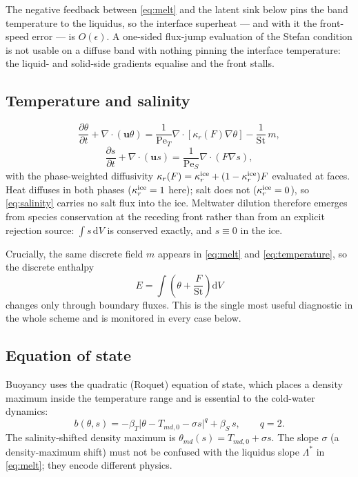 \documentclass[review,12pt]{elsarticle}
\newcommand{\uvec}{\mathbf{u}}
\newcommand{\Pet}{\mathrm{Pe}_T}
\newcommand{\Pes}{\mathrm{Pe}_S}
\newcommand{\St}{\mathrm{St}}
\begin{document}
The negative feedback between \eqref{eq:melt} and the latent sink below pins the
band temperature to the liquidus, so the interface superheat --- and with it the
front-speed error --- is $O(\epsilon)$. A one-sided flux-jump evaluation of the
Stefan condition is not usable on a diffuse band with nothing pinning the
interface temperature: the liquid- and solid-side gradients equalise and the
front stalls.

\subsection{Temperature and salinity}

\begin{equation}
  \frac{\partial \theta}{\partial t} + \nabla\cdot(\uvec\theta)
  = \frac{1}{\Pet}\nabla\cdot\!\left[\kappa_r(F)\nabla\theta\right]
  - \frac{1}{\St}\,m ,
  \label{eq:temperature}
\end{equation}
\begin{equation}
  \frac{\partial s}{\partial t} + \nabla\cdot(\uvec s)
  = \frac{1}{\Pes}\nabla\cdot\!\left(F\nabla s\right),
  \label{eq:salinity}
\end{equation}
with the phase-weighted diffusivity $\kappa_r(F) = \kappa_r^{\rm ice} +
(1-\kappa_r^{\rm ice})F$ evaluated at faces. Heat diffuses in both phases
($\kappa_r^{\rm ice}=1$ here); salt does not ($\kappa_r^{\rm ice}=0$), so
\eqref{eq:salinity} carries no salt flux into the ice. Meltwater dilution
therefore emerges from species conservation at the receding front rather than
from an explicit rejection source: $\int s\,\mathrm{d}V$ is conserved exactly,
and $s\equiv 0$ in the ice.

Crucially, the same discrete field $m$ appears in \eqref{eq:melt} and
\eqref{eq:temperature}, so the discrete enthalpy
\begin{equation}
  E = \int \left(\theta + \frac{F}{\St}\right)\mathrm{d}V
  \label{eq:enthalpy}
\end{equation}
changes only through boundary fluxes. This is the single most useful diagnostic
in the whole scheme and is monitored in every case below.

\subsection{Equation of state}

Buoyancy uses the quadratic (Roquet) equation of state, which places a density
maximum inside the temperature range and is essential to the cold-water dynamics:
\begin{equation}
  b(\theta,s) = -\beta_T\bigl|\theta - T_{md,0} - \sigma s\bigr|^{q}
                + \beta_S\, s ,
  \qquad q=2 .
  \label{eq:eos}
\end{equation}
The salinity-shifted density maximum is $\theta_{md}(s) = T_{md,0} + \sigma s$.
The slope $\sigma$ (a density-maximum shift) must not be confused with the
liquidus slope $\Lambda^{*}$ in \eqref{eq:melt}; they encode different physics.
\end{document}
